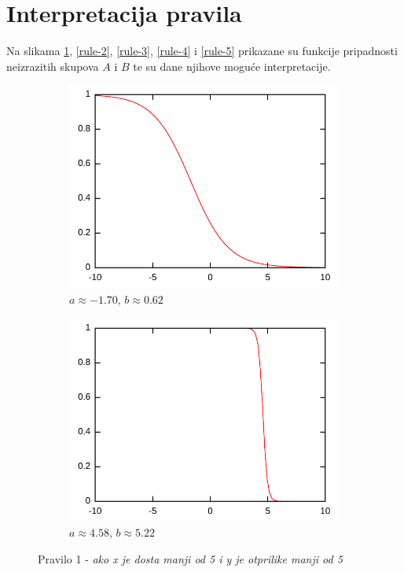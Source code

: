 \documentclass{article}
\begin{document}
\section{Interpretacija pravila}

Na slikama \ref{rule-1}, \ref{rule-2}, \ref{rule-3}, \ref{rule-4} i \ref{rule-5}
prikazane su funkcije pripadnosti neizrazitih skupova $A$ i $B$
te su dane njihove moguće interpretacije.

\begin{figure}[h]
    \centering
    \begin{subfigure}[b]{0.49\textwidth}
        \centering
        \includegraphics[width=\textwidth]{img/rule-1-A.pdf}
        \caption{$ a \approx -1.70 $, $ b \approx 0.62 $}
    \end{subfigure}
    \hfill
    \begin{subfigure}[b]{0.49\textwidth}
        \centering
        \includegraphics[width=\textwidth]{img/rule-1-B.pdf}
        \caption{$ a \approx 4.58 $, $ b \approx 5.22 $}
    \end{subfigure}
    \hfill
    \caption{Pravilo 1 - \textit{ako x je dosta manji od 5 i y je otprilike manji od 5}}
    \label{rule-1}
\end{figure}
\end{document}
